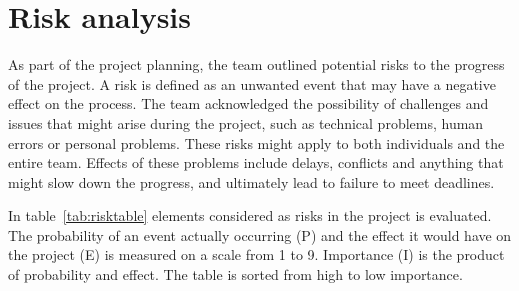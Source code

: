 \newpage
\section{Risk analysis}

\label{sec:risk}
As part of the project planning, the team outlined potential risks to the progress of the project. A risk is defined as an unwanted event that may have a negative effect on the process. The team acknowledged the possibility of challenges and issues that might arise during the project, such as technical problems, human errors or personal problems. These risks might apply to both individuals and the entire team. Effects of these problems include delays, conflicts and anything that might slow down the progress, and ultimately lead to failure to meet deadlines. 

In table~\ref{tab:risktable} elements considered as risks in the project is evaluated. The probability of an event actually occurring (P) and the effect it would have on the project (E) is measured on a scale from 1 to 9. Importance (I) is the product of probability and effect. The table is sorted from high to low importance. 


